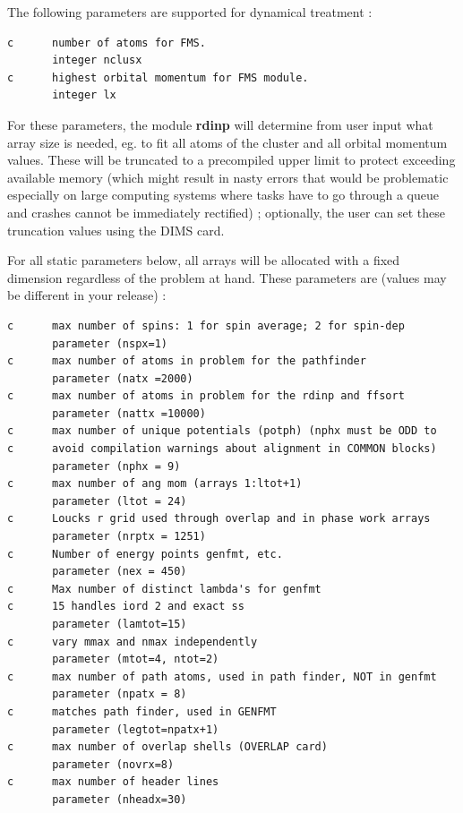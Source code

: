 \documentclass[11pt,oneside]{report} %
\renewcommand{\htmlref}[2]{\hyperlink{#2}{#1}}
\newcommand{\module}[1]{\textrm{\bf{#1}}}
\renewcommand{\htmlref}[2]{{#1}} %
\begin{document}
\begin{latexonly}
The following parameters are supported for dynamical treatment :
\begin{verbatim}
c      number of atoms for FMS.
       integer nclusx
c      highest orbital momentum for FMS module.
       integer lx
\end{verbatim}

For these parameters, the module \module{rdinp} will determine from user input what array size is needed, eg.
to fit all atoms of the cluster and all orbital momentum values.  These will be truncated to a precompiled upper
limit to protect exceeding available memory (which might result in nasty errors that would be problematic
especially on large computing systems where tasks have to go through a queue and crashes cannot be immediately
rectified) ; optionally, the user can set these truncation values using the \htmlref{DIMS}{card:dim} card.

For all static parameters below, all arrays will be allocated with a fixed dimension regardless of the
problem at hand.  These parameters are (values may be different in your release) :


\begin{verbatim}
c      max number of spins: 1 for spin average; 2 for spin-dep
       parameter (nspx=1)
c      max number of atoms in problem for the pathfinder
       parameter (natx =2000)
c      max number of atoms in problem for the rdinp and ffsort
       parameter (nattx =10000)
c      max number of unique potentials (potph) (nphx must be ODD to 
c      avoid compilation warnings about alignment in COMMON blocks)
       parameter (nphx = 9)
c      max number of ang mom (arrays 1:ltot+1)
       parameter (ltot = 24)
c      Loucks r grid used through overlap and in phase work arrays
       parameter (nrptx = 1251)
c      Number of energy points genfmt, etc.
       parameter (nex = 450)
c      Max number of distinct lambda's for genfmt
c      15 handles iord 2 and exact ss
       parameter (lamtot=15)
c      vary mmax and nmax independently
       parameter (mtot=4, ntot=2)
c      max number of path atoms, used in path finder, NOT in genfmt
       parameter (npatx = 8)
c      matches path finder, used in GENFMT
       parameter (legtot=npatx+1)
c      max number of overlap shells (OVERLAP card)
       parameter (novrx=8)
c      max number of header lines
       parameter (nheadx=30)
       
\end{verbatim}



\end{latexonly}
\end{document}
